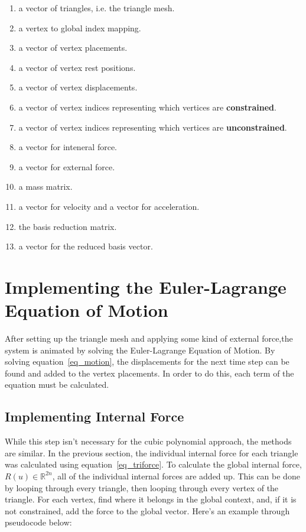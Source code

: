 \documentclass[twocolumn,10pt]{asme2ej}
\begin{document}
\begin{enumerate}
  \item a vector of triangles, i.e. the triangle mesh.
  \item a vertex to global index mapping.
  \item a vector of vertex placements.
  \item a vector of vertex rest positions.
  \item a vector of vertex displacements.
  \item a vector of vertex indices representing which vertices are \textbf{constrained}.
  \item a vector of vertex indices representing which vertices are \textbf{unconstrained}.
  \item a vector for inteneral force.
  \item a vector for external force.
  \item a mass matrix.
  \item a vector for velocity and a vector for acceleration.
  \item the basis reduction matrix.
  \item a vector for the reduced basis vector.
\end{enumerate}

\section{Implementing the Euler-Lagrange Equation of Motion}

After setting up the triangle mesh and applying some kind of external force,the system is animated by solving the Euler-Lagrange Equation of Motion. By solving equation~\ref{eq_motion}, the displacements for the next time step can be found and added to the vertex placements. In order to do this, each term of the equation must be calculated.

\subsection{Implementing Internal Force}

While this step isn't necessary for the cubic polynomial approach, the methods are similar. In the previous section, the individual internal force for each triangle was calculated using equation~\ref{eq_triforce}. To calculate the global internal force, $R(u) \in \mathbb{R}^{2n}$, all of the individual internal forces are added up. This can be done by looping through every triangle, then looping through every vertex of the triangle. For each vertex, find where it belongs in the global context, and, if it is not constrained, add the force to the global vector. Here's an example through pseudocode below:
\end{document}
